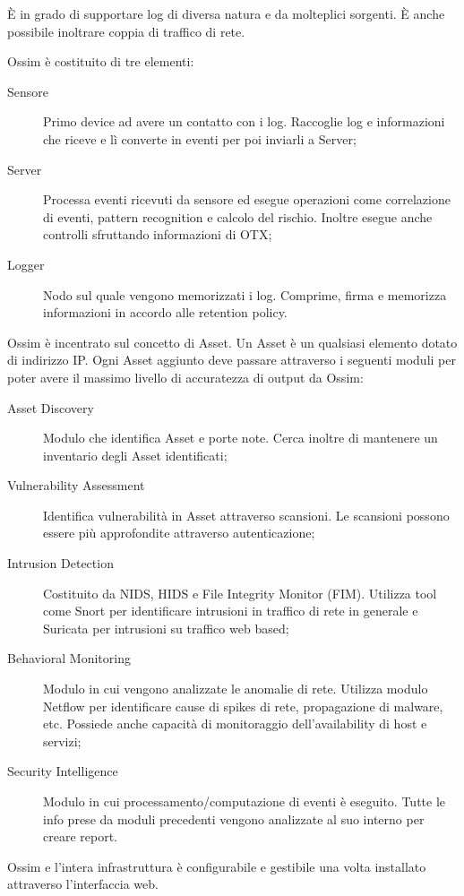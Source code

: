 È in grado di supportare log di diversa natura e da molteplici sorgenti. È anche possibile inoltrare coppia di traffico di rete.

Ossim è costituito di tre elementi:
\begin{description}
    \item [Sensore] Primo device ad avere un contatto con i log. Raccoglie log e informazioni che riceve e lì converte in eventi per poi inviarli a Server;
    \item [Server] Processa eventi ricevuti da sensore ed esegue operazioni come correlazione di eventi, pattern recognition e calcolo del rischio. Inoltre esegue anche controlli sfruttando informazioni di OTX;
    \item [Logger] Nodo sul quale vengono memorizzati i log. Comprime, firma e memorizza informazioni in accordo alle retention policy.
\end{description}

Ossim è incentrato sul concetto di Asset. Un Asset è un qualsiasi elemento dotato di indirizzo IP.
Ogni Asset aggiunto deve passare attraverso i seguenti moduli per poter avere il massimo livello di accuratezza di output da Ossim:
\begin{description}
    \item [Asset Discovery] Modulo che identifica Asset e porte note. Cerca inoltre di mantenere un inventario degli Asset identificati;
    \item [Vulnerability Assessment] Identifica vulnerabilità in Asset attraverso scansioni. Le scansioni possono essere più approfondite attraverso autenticazione;
    \item [Intrusion Detection] Costituito da NIDS, HIDS e File Integrity Monitor (FIM). Utilizza tool come Snort per identificare intrusioni in  traffico di rete in generale e Suricata per intrusioni su traffico web based;
    \item [Behavioral Monitoring] Modulo in cui vengono analizzate le anomalie di rete. Utilizza modulo Netflow per identificare cause di spikes di rete, propagazione di malware, etc.
    Possiede anche capacità di monitoraggio dell'availability di host e servizi;
    \item [Security Intelligence] Modulo in cui processamento/computazione di eventi è eseguito. Tutte le info prese da moduli precedenti vengono analizzate al suo interno per creare report. 
\end{description}

Ossim e l'intera infrastruttura è configurabile e gestibile una volta installato attraverso l'interfaccia web.


